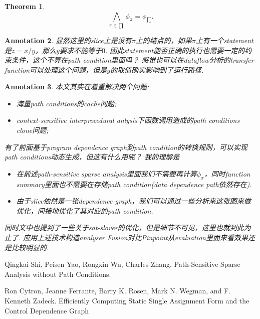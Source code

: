 \documentclass{article}
\newtheorem{theorem}{Theorem}[section]
\newtheorem{annotation}[theorem]{Annotation}
\begin{document}
\begin{theorem}
\rm 
$$
\bigwedge_{\pi \in {\prod}} \phi_\pi= \phi_{\prod}.
$$
\end{theorem}

\begin{annotation}
\rm 显然这里的slice上是没有$\pi$上的结点的，如果$\pi$上有一个statement是$z = x/y$，那么$y$要求不能等于$0$. 因此statement能否正确的执行也需要一定的约束条件，这个不算在path condition里面吗？ 感觉也可以在dataflow分析的transfer function可以处理这个问题，但是$y$的取值确实影响到了运行路径. 
\end{annotation}

\begin{annotation}
\rm 本文其实在着重解决两个问题:
\begin{itemize}
	\item 海量path conditions的cache问题;
	\item context-sensitive interprocedural anlysis下函数调用造成的path conditions clone问题;
\end{itemize}
有了前面基于program dependence graph到path condition的转换规则，可以实现path conditions动态生成，但这有什么用呢？ 我的理解是
\begin{itemize}
	\item 在前述path-sensitive sparse analysis里面我们不需要再计算$\phi_\pi$，同时function summary里面也不需要在存储path condition(data dependence path依然存在).  
	\item 由于slice依然是一张dependence graph，我们可以通过一些分析来这张图来做优化，间接地优化了其对应的path condition.  
\end{itemize}
同时文中也提到了一些关于sat-slover的优化，但是细节不可见，这里也就到此为止了. 应用上述技术构造analyser Fusion对比Pinpoint从evaluation里面来看效果还是比较明显的.
\end{annotation}


\begin{thebibliography}{9}
Qingkai Shi, Peisen Yao, Rongxin Wu, Charles Zhang. Path-Sensitive Sparse Analysis without Path Conditions.

Ron Cytron, Jeanne Ferrante, Barry K. Rosen, Mark N. Wegman, and F. Kenneth Zadeck. Efficiently Computing Static Single Assignment Form and the Control Dependence Graph
\end{thebibliography}
\end{document}
